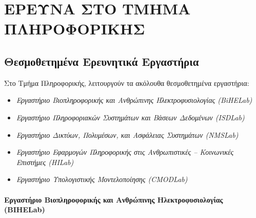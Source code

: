 \hypertarget{ux3b5ux3c1ux3b5ux3c5ux3bdux3b1-ux3c3ux3c4ux3bf-ux3c4ux3bcux3b7ux3bcux3b1-ux3c0ux3bbux3b7ux3c1ux3bfux3c6ux3bfux3c1ux3b9ux3baux3b7ux3c3}{%
\chapter{ΕΡΕΥΝΑ ΣΤΟ ΤΜΗΜΑ
ΠΛΗΡΟΦΟΡΙΚΗΣ}\label{ux3b5ux3c1ux3b5ux3c5ux3bdux3b1-ux3c3ux3c4ux3bf-ux3c4ux3bcux3b7ux3bcux3b1-ux3c0ux3bbux3b7ux3c1ux3bfux3c6ux3bfux3c1ux3b9ux3baux3b7ux3c3}}

\hypertarget{ux3b8ux3b5ux3c3ux3bcux3bfux3b8ux3b5ux3c4ux3b7ux3bcux3adux3bdux3b1-ux3b5ux3c1ux3b5ux3c5ux3bdux3b7ux3c4ux3b9ux3baux3ac-ux3b5ux3c1ux3b3ux3b1ux3c3ux3c4ux3aeux3c1ux3b9ux3b1}{%
\section{Θεσμοθετημένα Ερευνητικά
Εργαστήρια}\label{ux3b8ux3b5ux3c3ux3bcux3bfux3b8ux3b5ux3c4ux3b7ux3bcux3adux3bdux3b1-ux3b5ux3c1ux3b5ux3c5ux3bdux3b7ux3c4ux3b9ux3baux3ac-ux3b5ux3c1ux3b3ux3b1ux3c3ux3c4ux3aeux3c1ux3b9ux3b1}}

Στο Τμήμα Πληροφορικής, λειτουργούν τα ακόλουθα θεσμοθετημένα
εργαστήρια:

\begin{itemize}
\tightlist
\item
  \emph{Εργαστήριο Βιοπληροφορικής και Ανθρώπινης Ηλεκτροφυσιολογίας
  (BiHELab)}
\item
  \emph{Εργαστήριο Πληροφοριακών Συστημάτων και Βάσεων Δεδομένων
  (ISDLab)}
\item
  \emph{Εργαστήριο Δικτύων, Πολυμέσων, και Ασφάλειας Συστημάτων
  (NMSLab)}
\item
  \emph{Εργαστήριο Εφαρμογών Πληροφορικής στις Ανθρωπιστικές --
  Κοινωνικές Επιστήμες (HILab)}
\item
  \emph{Εργαστήριο Υπολογιστικής Μοντελοποίησης (CMODLab)}
\end{itemize}

\hypertarget{ux3b5ux3c1ux3b3ux3b1ux3c3ux3c4ux3aeux3c1ux3b9ux3bf-ux3b2ux3b9ux3bfux3c0ux3bbux3b7ux3c1ux3bfux3c6ux3bfux3c1ux3b9ux3baux3aeux3c2-ux3baux3b1ux3b9-ux3b1ux3bdux3b8ux3c1ux3ceux3c0ux3b9ux3bdux3b7ux3c2-ux3b7ux3bbux3b5ux3baux3c4ux3c1ux3bfux3c6ux3c5ux3c3ux3b9ux3bfux3bbux3bfux3b3ux3afux3b1ux3c2-bihelab}{%
\subsubsection{Εργαστήριο Βιοπληροφορικής και Ανθρώπινης
Ηλεκτροφυσιολογίας
(BIHELab)}\label{ux3b5ux3c1ux3b3ux3b1ux3c3ux3c4ux3aeux3c1ux3b9ux3bf-ux3b2ux3b9ux3bfux3c0ux3bbux3b7ux3c1ux3bfux3c6ux3bfux3c1ux3b9ux3baux3aeux3c2-ux3baux3b1ux3b9-ux3b1ux3bdux3b8ux3c1ux3ceux3c0ux3b9ux3bdux3b7ux3c2-ux3b7ux3bbux3b5ux3baux3c4ux3c1ux3bfux3c6ux3c5ux3c3ux3b9ux3bfux3bbux3bfux3b3ux3afux3b1ux3c2-bihelab}}

